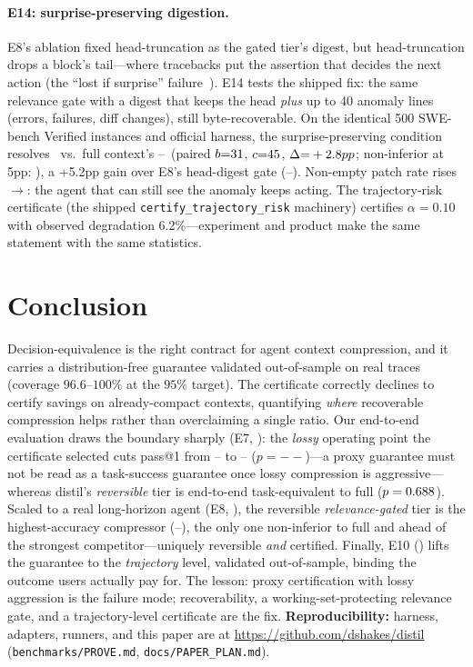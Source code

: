 \documentclass{article}
\newcommand{\sweEsevenFullPass}{--}\newcommand{\sweEsevenFullResolved}{--}%
\newcommand{\sweEsevenDistilPass}{--}\newcommand{\sweEsevenDistilResolved}{--}%
\newcommand{\sweEsevenDistilVsFullP}{--}\newcommand{\sweEsevenLinguaVsFullP}{--}%
\newcommand{\sweEeightFullPass}{--}\newcommand{\sweEeightFullResolved}{--}%
\newcommand{\sweEeightGatedPass}{--}\newcommand{\sweEeightGatedResolved}{--}%
\begin{document}
\paragraph{E14: surprise-preserving digestion.}
E8's ablation fixed head-truncation as the gated tier's digest, but head-truncation drops a
block's tail---where tracebacks put the assertion that decides the next action (the ``lost if
surprise'' failure~\cite{silverbullet}). E14 tests the shipped fix: the same relevance gate with
a digest that keeps the head \emph{plus} up to 40 anomaly lines (errors, failures, diff changes),
still byte-recoverable. On the identical 500 SWE-bench Verified instances and official harness,
the surprise-preserving condition resolves \sweEfourteenPass\ vs.\ full context's \sweEeightFullPass\
(paired $b{=}31$, $c{=}45$, $\Delta{=}+2.8pp$; non-inferior at
5pp: \sweEfourteenNI), a +5.2pp gain over E8's head-digest gate (\sweEeightGatedPass). Non-empty
patch rate rises \sweEeightGatedPatchRate$\rightarrow$\sweEfourteenPatchRate: the agent that can
still see the anomaly keeps acting. The trajectory-risk certificate (the shipped
\texttt{certify\_trajectory\_risk} machinery) certifies $\alpha{=}0.10$ with observed degradation
6.2\%---experiment and product make the same statement with the same statistics.

\section{Conclusion}
Decision-equivalence is the right contract for agent context compression, and it carries a
distribution-free guarantee validated out-of-sample on real traces (coverage $96.6$--$100\%$
at the $95\%$ target). The certificate correctly declines to certify savings on
already-compact contexts, quantifying \emph{where} recoverable compression helps rather than
overclaiming a single ratio. Our end-to-end evaluation draws the boundary sharply (E7,
\Cref{sec:e7}): the \emph{lossy} operating point the certificate selected cuts pass@1 from
\sweEsevenFullPass{} to \sweEsevenDistilPass{} ($p=\sweEsevenDistilVsFullP{}$)---a proxy
guarantee must not be read as a task-success guarantee once lossy compression is
aggressive---whereas distil's \emph{reversible} tier is end-to-end task-equivalent to full
($p=0.688{}$). Scaled to a real long-horizon agent (E8, \Cref{sec:e8}), the
reversible \emph{relevance-gated} tier is the highest-accuracy compressor
(\sweEeightGatedPass{}), the only one non-inferior to full and ahead of the strongest
competitor---uniquely reversible \emph{and} certified. Finally, E10 (\Cref{sec:e10}) lifts the
guarantee to the \emph{trajectory} level, validated out-of-sample, binding the outcome users
actually pay for. The lesson: proxy certification with lossy aggression is the failure mode;
recoverability, a working-set-protecting relevance gate, and a trajectory-level certificate
are the fix. \textbf{Reproducibility:} harness, adapters, runners, and this paper are at
\url{https://github.com/dshakes/distil} (\texttt{benchmarks/PROVE.md}, \texttt{docs/PAPER\_PLAN.md}).
\end{document}
